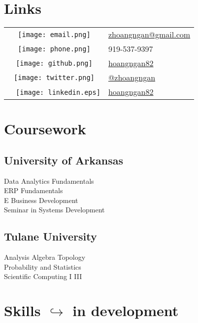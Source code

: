 \documentclass[]{deedy-resume-openfont}
\def\mysep{$\hookrightarrow$ }
\def\tb{\textbullet}
\begin{document}
\begin{minipage}[t]{0.33\textwidth}
\section{Links} 
\begin{tabular}{cl}
  \texttt{[image: email.png]} &
  \href{mailto:zhoangngan@gmail.com}{zhoangngan@gmail.com}\\
  \texttt{[image: phone.png]} & 919-537-9397 \\
\texttt{[image: github.png]} & \href{https://github.com/hoangngan82}{{hoangngan82}} \\
 \texttt{[image: twitter.png]} &
 \href{https://twitter.com/zhoangngan}{{@zhoangngan}} \\
\ \ \texttt{[image: linkedin.eps]} &
 \href{https://www.linkedin.com/in/hoangngan82}{{hoangngan82}} 
\end{tabular}
\sectionsep


\section{Coursework}
\subsection{University of Arkansas}
Data Analytics Fundamentals \\
ERP Fundamentals \\
E Business Development \\
Seminar in Systems Development \\
\sectionsep

\subsection{Tulane University}
Analysis \tb{} Algebra \tb{} Topology \\
Probability and Statistics \\
Scientific Computing I \tb{} III \\
\sectionsep


\section{Skills \small \mysep in development}

\end{minipage}
\end{document}
